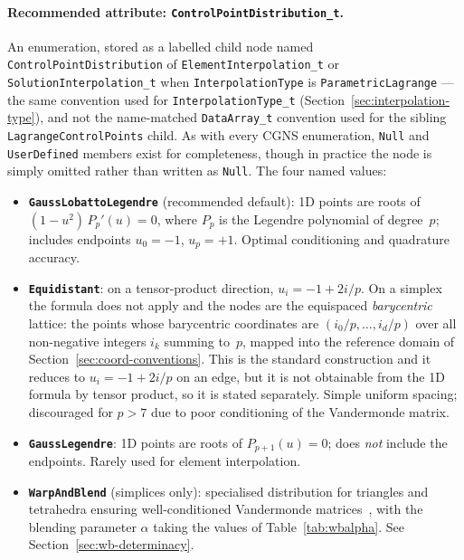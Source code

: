 \documentclass[11pt,letterpaper]{article}
\newif\ifvfourdraft
\newcommand{\vfour}[1]{\ifvfourdraft\textcolor{v4violet}{#1}\else#1\fi}
\begin{document}
\paragraph{Recommended attribute: \texttt{ControlPointDistribution\_t}.}
An enumeration, stored as a labelled child node named
\texttt{ControlPointDistribution} of \texttt{ElementInterpolation\_t} or
\texttt{SolutionInterpolation\_t} when \texttt{InterpolationType} is
\texttt{ParametricLagrange} --- the same convention used for \texttt{InterpolationType\_t}
(Section~\ref{sec:interpolation-type}), and not the name-matched \texttt{DataArray\_t}
convention used for the sibling \texttt{LagrangeControlPoints} child.  As with
every CGNS enumeration, \texttt{Null} and
\texttt{UserDefined} members exist for completeness, though in practice the node is simply
omitted rather than written as \texttt{Null}.  The four named values:

{\sloppy
\begin{itemize}
  \item \textbf{\texttt{GaussLobattoLegendre}} (recommended default): 1D points are roots of
    $(1-u^2)\,P_p'(u)=0$, where $P_p$ is the Legendre polynomial of degree~$p$; includes
    endpoints $u_0 = -1$, $u_p = +1$.  Optimal conditioning and quadrature accuracy.
  \item \textbf{\texttt{Equidistant}}: on a tensor-product direction,
    $u_i = -1 + 2i/p$.  \vfour{On a simplex the formula does not apply and the
    nodes are the equispaced \emph{barycentric} lattice: the points whose
    barycentric coordinates are $(i_0/p, \ldots, i_d/p)$ over all non-negative
    integers $i_k$ summing to~$p$, mapped into the reference domain of
    Section~\ref{sec:coord-conventions}.  This is the standard construction and
    it reduces to $u_i = -1 + 2i/p$ on an edge, but it is not obtainable from the
    1D formula by tensor product, so it is stated separately.}  Simple uniform
    spacing; discouraged for $p>7$ due to poor conditioning of the Vandermonde
    matrix.
  \item \textbf{\texttt{GaussLegendre}}: 1D points are roots of
    \vfour{$P_{p+1}(u)=0$}; does \emph{not} include the endpoints.  Rarely used
    for element interpolation.
  \item \textbf{\texttt{WarpAndBlend}} (simplices only): specialised distribution for triangles
    and tetrahedra ensuring well-conditioned Vandermonde matrices~\cite{Warburton06},
    \vfour{with the blending parameter $\alpha$ taking the values of
    Table~\ref{tab:wbalpha}.  See Section~\ref{sec:wb-determinacy}.}
\end{itemize}
\par}
\end{document}
